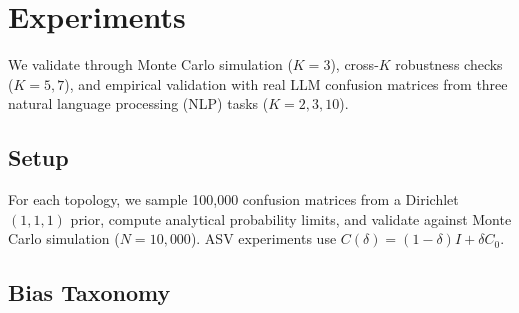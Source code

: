 \section{Experiments}
\label{sec:experiments}

\begin{table}[t]
\centering
\caption{Bias under $K{=}3$ non-differential misclassification (100{,}000 Dirichlet$(1,1,1)$ matrices). Violation: $|\text{bias}| > 0$; Sign Flip: any coefficient reverses sign; Amplif.: $|\hat{\tau}| > |\tau|$. $\tau_{\text{sf}}{=}0$?: sign-flip guarantee holds unconditionally (Yes), conditionally (Cond.; Proposition~\ref{prop:signflip}), or not (No). Collider 100\% amplification reflects Berkson bias; misclassification is protective.}
\label{tab:taxonomy}
\small
{}
\end{table}

We validate through Monte Carlo simulation ($K{=}3$), cross-$K$ robustness checks ($K{=}5,7$), and empirical validation with real LLM confusion matrices from three natural language processing (NLP) tasks ($K{=}2,3,10$).

\subsection{Setup}
\label{sec:setup}

For each topology, we sample 100{,}000 confusion matrices from a Dirichlet$(1,1,1)$ prior, compute analytical probability limits, and validate against Monte Carlo simulation ($N{=}10{,}000$). ASV experiments use $C(\delta) = (1{-}\delta)I + \delta C_0$.

\subsection{Bias Taxonomy}
\label{sec:taxonomy_results}

